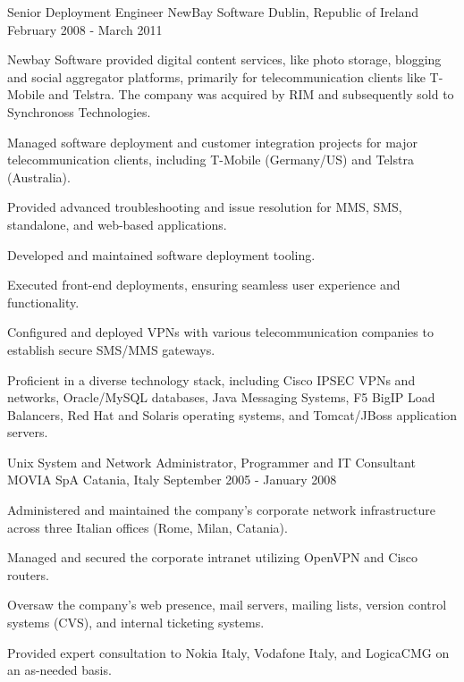 \begin{cventries}
  \cventry
  {Senior Deployment Engineer} %
  {NewBay Software} %
  {Dublin, Republic of Ireland} %
  {February 2008 - March 2011} %
  {
    Newbay Software provided digital content services, like photo storage, blogging and social aggregator platforms,
    primarily for telecommunication clients like T-Mobile and Telstra.
    The company was acquired by RIM and subsequently sold to Synchronoss Technologies.
    \vspace{2mm}
    \begin{cvitems} %
      \item Managed software deployment and customer integration projects for major telecommunication clients, including T-Mobile (Germany/US) and Telstra (Australia).
      \item Provided advanced troubleshooting and issue resolution for MMS, SMS, standalone, and web-based applications.
      \item Developed and maintained software deployment tooling.
      \item Executed front-end deployments, ensuring seamless user experience and functionality.
      \item Configured and deployed VPNs with various telecommunication companies to establish secure SMS/MMS gateways.
      \item Proficient in a diverse technology stack, including Cisco IPSEC VPNs and networks, Oracle/MySQL databases, Java Messaging Systems, F5 BigIP Load Balancers, Red Hat and Solaris operating systems, and Tomcat/JBoss application servers.
    \end{cvitems}
  }

  \cventry
  {Unix System and Network Administrator, Programmer and IT Consultant} %
  {MOVIA SpA} %
  {Catania, Italy} %
  {September 2005 - January 2008} %
  {
    \begin{cvitems} %
      \item Administered and maintained the company's corporate network infrastructure across three Italian offices (Rome, Milan, Catania).
      \item Managed and secured the corporate intranet utilizing OpenVPN and Cisco routers.
      \item Oversaw the company's web presence, mail servers, mailing lists, version control systems (CVS), and internal ticketing systems.
      \item Provided expert consultation to Nokia Italy, Vodafone Italy, and LogicaCMG on an as-needed basis.
    \end{cvitems}
  }


\end{cventries}
